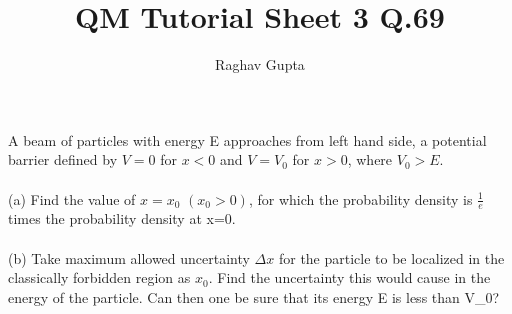 \documentclass{article}
\begin{document}
\title{QM Tutorial Sheet 3 Q.69}
\author{Raghav Gupta}
\maketitle
A beam of particles with energy E approaches from left hand side, a potential barrier defined by \(V=0\)
for \(x<0\) and \(V=V_0\) for \(x>0\), where \(V_0>E.\)\\\\
(a) Find the value of \(x=x_0\) \((x_0>0)\), for which the probability density is \(\frac{1}{e}\) times the probability
density at x=0.\\\\
(b) Take maximum allowed uncertainty \(\Delta x\) for the particle to be localized in the classically forbidden
region as \(x_0\). Find the uncertainty this would cause in the energy of the particle. Can then one be
sure that its energy E is less than V_0?\\\\
\end{document}
